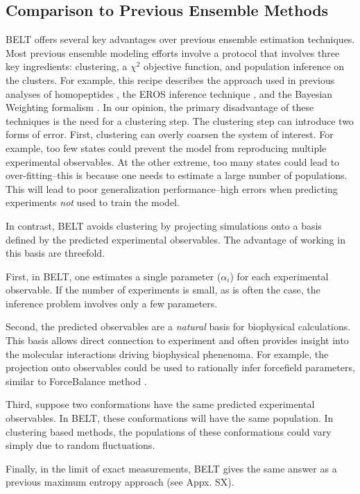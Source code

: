 \documentclass[journal=jacsat,manuscript=article]{achemso}
\begin{document}
\subsection{Comparison to Previous Ensemble Methods}

BELT offers several key advantages over previous ensemble estimation techniques.  Most previous ensemble modeling efforts involve a protocol that involves three key ingredients: clustering, a $\chi^2$ objective function, and population inference on the clusters.  For example, this recipe describes the approach used in previous analyses of homopeptides \cite{Graf2007}, the EROS inference technique \cite{rozycki2011saxs}, and the Bayesian Weighting formalism \cite{fisher2010}.  In our opinion, the primary disadvantage of these techniques is the need for a clustering step.  The clustering step can introduce two forms of error.  First, clustering can overly coarsen the system of interest.  For example, too few states could prevent the model from reproducing multiple experimental observables.  At the other extreme, too many states could lead to over-fitting--this is because one needs to estimate a large number of populations.  This will lead to poor generalization performance--high errors 
when predicting experiments \emph{not} used to train the model.  

In contrast, BELT avoids clustering by projecting simulations onto a basis defined by the predicted experimental observables.  The advantage of working in this basis are threefold.  

First, in BELT, one estimates a single parameter ($\alpha_i$) for each experimental observable.  If the number of experiments is small, as is often the case, the inference problem involves only a few parameters.

Second, the predicted observables are a \emph{natural} basis for biophysical calculations.  This basis allows direct connection to experiment and often provides insight into the molecular interactions driving biophysical phenenoma.  For example, the projection onto observables could be used to rationally infer forcefield parameters, similar to ForceBalance method \cite{wang2012, wang2013systematic}.  

Third, suppose two conformations have the same predicted experimental observables.  In BELT, these conformations will have the same population.  In clustering based methods, the populations of these conformations could vary simply due to random fluctuations.  

Finally, in the limit of exact measurements, BELT gives the same answer as a previous \cite{chodera2012} maximum entropy approach (see Appx. SX).  
\end{document}
